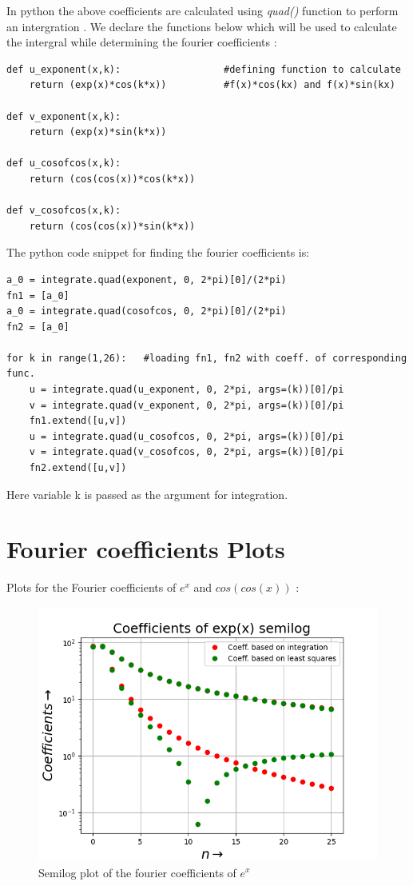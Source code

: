 \documentclass[11pt, a4paper]{article}
\begin{document}
In python the above coefficients are calculated using \textit{quad()} function to perform an intergration . We declare the functions below which will be used to calculate the intergral while determining the fourier coefficients :
\begin{verbatim}
def u_exponent(x,k):                  #defining function to calculate 
    return (exp(x)*cos(k*x))          #f(x)*cos(kx) and f(x)*sin(kx)

def v_exponent(x,k):
    return (exp(x)*sin(k*x))

def u_cosofcos(x,k):
    return (cos(cos(x))*cos(k*x))

def v_cosofcos(x,k):
    return (cos(cos(x))*sin(k*x))
\end{verbatim}
The python code snippet for finding the fourier coefficients is:
\begin{verbatim}
a_0 = integrate.quad(exponent, 0, 2*pi)[0]/(2*pi)
fn1 = [a_0]
a_0 = integrate.quad(cosofcos, 0, 2*pi)[0]/(2*pi)
fn2 = [a_0]

for k in range(1,26):   #loading fn1, fn2 with coeff. of corresponding func.
    u = integrate.quad(u_exponent, 0, 2*pi, args=(k))[0]/pi
    v = integrate.quad(v_exponent, 0, 2*pi, args=(k))[0]/pi
    fn1.extend([u,v])
    u = integrate.quad(u_cosofcos, 0, 2*pi, args=(k))[0]/pi
    v = integrate.quad(v_cosofcos, 0, 2*pi, args=(k))[0]/pi
    fn2.extend([u,v])
\end{verbatim}
Here variable k is passed as the argument for integration.
  
\section{Fourier coefficients Plots}
Plots for the Fourier coefficients of $e^{x}$ and $cos(cos(x))$ :
	\begin{figure}[!tbh]
   	\centering
   	\includegraphics[scale=0.6]{Figure_3.png}   
   	\caption{Semilog plot of the fourier coefficients of $e^{x}$}
   	\label{fig:sample}
   \end{figure} 
\end{document}
